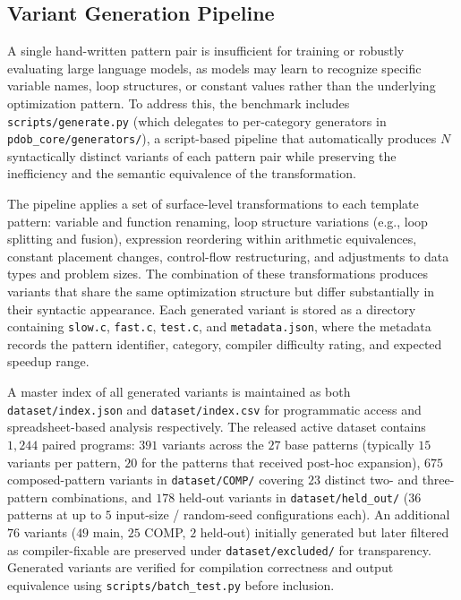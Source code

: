 \subsection{Variant Generation Pipeline}

A single hand-written pattern pair is insufficient for training or robustly evaluating large language models, as models may learn to recognize specific variable names, loop structures, or constant values rather than the underlying optimization pattern. To address this, the benchmark includes \texttt{scripts/generate.py} (which delegates to per-category generators in \texttt{pdob\_core/generators/}), a script-based pipeline that automatically produces $N$ syntactically distinct variants of each pattern pair while preserving the inefficiency and the semantic equivalence of the transformation.

The pipeline applies a set of surface-level transformations to each template pattern: variable and function renaming, loop structure variations (e.g., loop splitting and fusion), expression reordering within arithmetic equivalences, constant placement changes, control-flow restructuring, and adjustments to data types and problem sizes. The combination of these transformations produces variants that share the same optimization structure but differ substantially in their syntactic appearance. Each generated variant is stored as a directory containing \texttt{slow.c}, \texttt{fast.c}, \texttt{test.c}, and \texttt{metadata.json}, where the metadata records the pattern identifier, category, compiler difficulty rating, and expected speedup range.

A master index of all generated variants is maintained as both \texttt{dataset/index.json} and \texttt{dataset/index.csv} for programmatic access and spreadsheet-based analysis respectively. The released active dataset contains $1{,}244$ paired programs: $391$ variants across the $27$ base patterns (typically $15$ variants per pattern, $20$ for the patterns that received post-hoc expansion), $675$ composed-pattern variants in \texttt{dataset/COMP/} covering $23$ distinct two- and three-pattern combinations, and $178$ held-out variants in \texttt{dataset/held\_out/} ($36$ patterns at up to $5$ input-size / random-seed configurations each). An additional $76$ variants ($49$ main, $25$ COMP, $2$ held-out) initially generated but later filtered as compiler-fixable are preserved under \texttt{dataset/excluded/} for transparency. Generated variants are verified for compilation correctness and output equivalence using \texttt{scripts/batch\_test.py} before inclusion.

